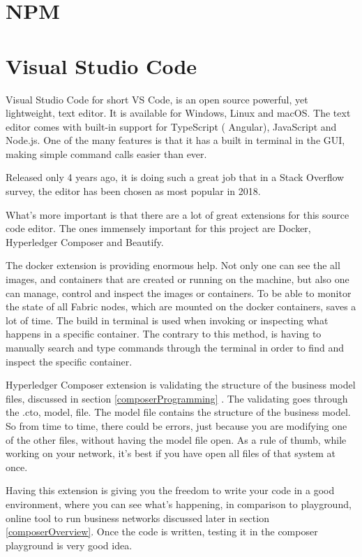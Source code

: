 \documentclass[a4paper,11pt]{report}
\begin{document}
\section{NPM}

\section{Visual Studio Code}
\label{vsCode}

Visual Studio Code for short VS Code, is an open source powerful, yet lightweight, text editor. It is available for Windows, Linux and macOS. The text editor comes with built-in support for TypeScript ( Angular), JavaScript and Node.js. One of the many features is that it has a built in terminal in the GUI, making simple command calls easier than ever.

Released only 4 years ago, it is doing such a great job that in a Stack Overflow survey, the editor has been chosen as most popular in 2018.\cite{stackoverflow}

What’s more important is that there are a lot of great extensions for this source code editor. The ones immensely important for this project are Docker, Hyperledger Composer and Beautify. 

The docker extension is providing enormous help. Not only one can see the all images, and containers that are created or running on the machine, but also one can manage, control and inspect the images or containers. To be able to monitor the state of all Fabric nodes, which are mounted on the docker containers, saves a lot of time. The build in terminal is used when invoking or inspecting what happens in a specific container. The contrary to this method, is having to manually search and type commands through the terminal in order to find and inspect the specific container. 

Hyperledger Composer extension is validating the structure of the business model files, discussed in section \ref{composerProgramming} . The validating goes through the .cto, model, file. The model file contains the structure of the business model. So from time to time, there could be errors, just because you are modifying one of the other files, without having the model file open. As a rule of thumb, while working on your network, it’s best if you have open all files of that system at once.
  
Having this extension is giving you the freedom to write your code in a good environment, where you can see what’s happening, in comparison to playground, online tool to run business networks discussed later in section \ref{composerOverview}. Once the code is written, testing it in the composer playground is very good idea. 
\end{document}
